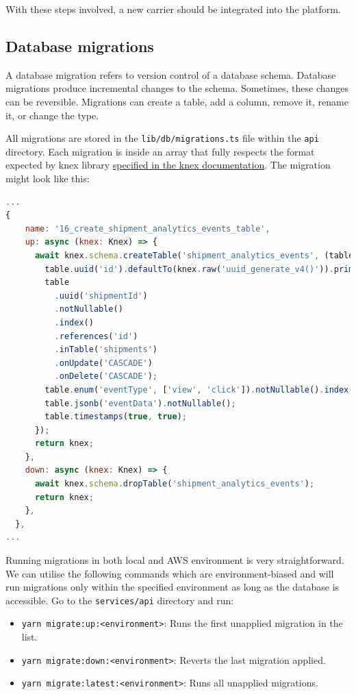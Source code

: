 With these steps involved, a new carrier should be integrated into the platform.

\subsection{Database migrations}
A database migration refers to version control of a database schema.
Database migrations produce incremental changes to the schema.
Sometimes, these changes can be reversible. 
Migrations can create a table, add a column, remove it, rename it, or change the type.

All migrations are stored in the \texttt{lib/db/migrations.ts} file within the \texttt{api} directory.
Each migration is inside an array that fully respects the format expected by \gls{knex} library \href{https://knexjs.org/guide/migrations.html#custom-migration-sources}{specified in the \gls{knex} documentation}.
The migration might look like this:
\begin{lstlisting}[language=javascript,caption={Example of a migration from \texttt{migrations.ts}}]
...
{
    name: '16_create_shipment_analytics_events_table',
    up: async (knex: Knex) => {
      await knex.schema.createTable('shipment_analytics_events', (table) => {
        table.uuid('id').defaultTo(knex.raw('uuid_generate_v4()')).primary();
        table
          .uuid('shipmentId')
          .notNullable()
          .index()
          .references('id')
          .inTable('shipments')
          .onUpdate('CASCADE')
          .onDelete('CASCADE');
        table.enum('eventType', ['view', 'click']).notNullable().index().defaultTo('view');
        table.jsonb('eventData').notNullable();
        table.timestamps(true, true);
      });
      return knex;
    },
    down: async (knex: Knex) => {
      await knex.schema.dropTable('shipment_analytics_events');
      return knex;
    },
  },
...
\end{lstlisting}

Running migrations in both local and AWS environment is very straightforward.
We can utilise the following commands which are environment-biased and will run migrations only within the specified environment as long as the database is accessible.
Go to the \texttt{services/api} directory and run:
\begin{itemize}
    \item \texttt{yarn migrate:up:<environment>}: Runs the first unapplied migration in the list.
    \item \texttt{yarn migrate:down:<environment>}: Reverts the last migration applied.
    \item \texttt{yarn migrate:latest:<environment>}: Runs all unapplied migrations.
\end{itemize}


